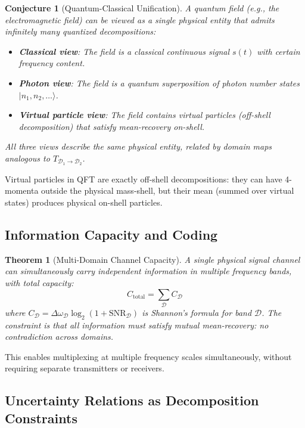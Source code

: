 \documentclass[twocolumn,11pt,a4paper]{article}
\newtheorem{theorem}{Theorem}[section]
\newtheorem{conjecture}{Conjecture}
\newcommand{\signal}{s}
\newcommand{\bandwidth}{\Delta{\omega}}
\newcommand{\domain}{\mathcal{D}}
\begin{document}
\begin{conjecture}[Quantum-Classical Unification]
A quantum field (e.g., the electromagnetic field) can be viewed as a single physical entity that admits infinitely many quantized decompositions:
\begin{itemize}[nosep]
  \item \textbf{Classical view}: The field is a classical continuous signal $\signal(t)$ with certain frequency content.
  \item \textbf{Photon view}: The field is a quantum superposition of photon number states $|n_1, n_2, \ldots\rangle$.
  \item \textbf{Virtual particle view}: The field contains virtual particles (off-shell decomposition) that satisfy mean-recovery on-shell.
\end{itemize}
All three views describe the same physical entity, related by domain maps analogous to $T_{\domain_1 \to \domain_2}$.
\end{conjecture}

Virtual particles in QFT are exactly off-shell decompositions: they can have 4-momenta outside the physical mass-shell, but their mean (summed over virtual states) produces physical on-shell particles.

\subsection{Information Capacity and Coding}

\begin{theorem}[Multi-Domain Channel Capacity]
A single physical signal channel can simultaneously carry independent information in multiple frequency bands, with total capacity:
\begin{equation}
  C_{\text{total}} = \sum_{\domain} C_{\domain}
\end{equation}
where $C_{\domain} = \bandwidth_\domain \log_2(1 + \text{SNR}_\domain)$ is Shannon's formula for band $\domain$. The constraint is that all information must satisfy mutual mean-recovery: no contradiction across domains.
\end{theorem}

This enables multiplexing at multiple frequency scales simultaneously, without requiring separate transmitters or receivers.

\subsection{Uncertainty Relations as Decomposition Constraints}
\end{document}
